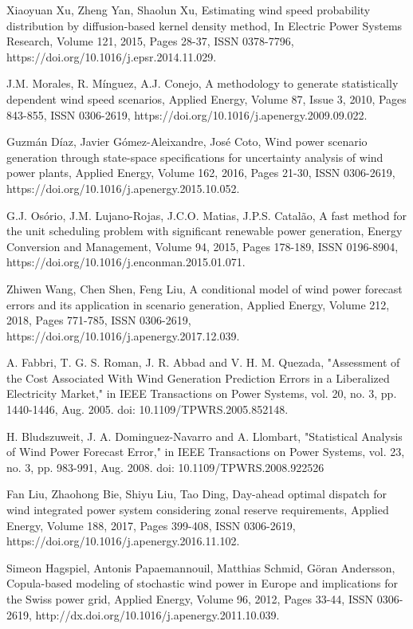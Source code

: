 \begin{thebibliography}{99}
\begin{singlespace}
Xiaoyuan Xu, Zheng Yan, Shaolun Xu, Estimating wind speed probability distribution by diffusion-based kernel density method, In Electric Power Systems Research, Volume 121, 2015, Pages 28-37, ISSN 0378-7796, https://doi.org/10.1016/j.epsr.2014.11.029.

 J.M. Morales, R. Mínguez, A.J. Conejo, A methodology to generate statistically dependent wind speed scenarios, Applied Energy, Volume 87, Issue 3, 2010, Pages 843-855, ISSN 0306-2619, https://doi.org/10.1016/j.apenergy.2009.09.022.

Guzmán Díaz, Javier Gómez-Aleixandre, José Coto, Wind power scenario generation through state-space specifications for uncertainty analysis of wind power plants, Applied Energy,
Volume 162, 2016, Pages 21-30, ISSN 0306-2619, https://doi.org/10.1016/j.apenergy.2015.10.052. 

 G.J. Osório, J.M. Lujano-Rojas, J.C.O. Matias, J.P.S. Catalão, A fast method for the unit scheduling problem with significant renewable power generation, Energy Conversion and Management, Volume 94, 2015, Pages 178-189, ISSN 0196-8904, https://doi.org/10.1016/j.enconman.2015.01.071.

 Zhiwen Wang, Chen Shen, Feng Liu, A conditional model of wind power forecast errors and its application in scenario generation,  Applied Energy, Volume 212, 2018, Pages 771-785,
ISSN 0306-2619, https://doi.org/10.1016/j.apenergy.2017.12.039.

 A. Fabbri, T. G. S. Roman, J. R. Abbad and V. H. M. Quezada, "Assessment of the Cost Associated With Wind Generation Prediction Errors in a Liberalized Electricity Market," in IEEE Transactions on Power Systems, vol. 20, no. 3, pp. 1440-1446, Aug. 2005. doi: 10.1109/TPWRS.2005.852148.

 H. Bludszuweit, J. A. Dominguez-Navarro and A. Llombart, "Statistical Analysis of Wind Power Forecast Error," in IEEE Transactions on Power Systems, vol. 23, no. 3, pp. 983-991, Aug. 2008. doi: 10.1109/TPWRS.2008.922526 

 Fan Liu, Zhaohong Bie, Shiyu Liu, Tao Ding, Day-ahead optimal dispatch for wind integrated power system considering zonal reserve requirements, Applied Energy, Volume 188, 2017, Pages 399-408, ISSN 0306-2619, https://doi.org/10.1016/j.apenergy.2016.11.102.

Simeon Hagspiel, Antonis Papaemannouil, Matthias Schmid, Göran Andersson, Copula-based modeling of stochastic wind power in Europe and implications for the Swiss power grid, Applied Energy, Volume 96, 2012, Pages 33-44, ISSN 0306-2619, http://dx.doi.org/10.1016/j.apenergy.2011.10.039.


\end{singlespace}
\end{thebibliography}
